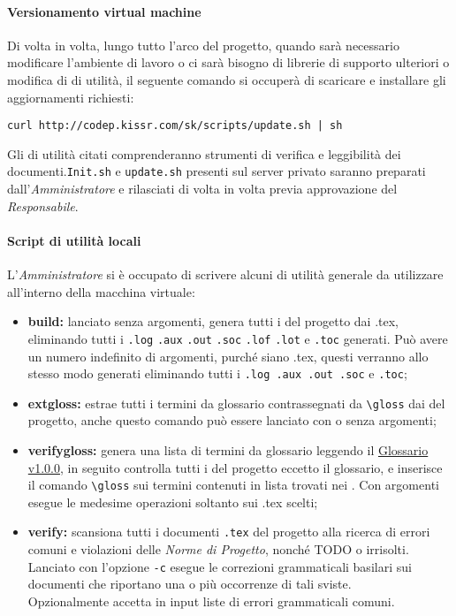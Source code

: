 \documentclass{scalatekids-article}
\begin{document}
\paragraph{Versionamento virtual machine}

Di volta in volta, lungo tutto l'arco del progetto, quando sarà necessario
modificare l'ambiente di lavoro o ci sarà bisogno di librerie di supporto
ulteriori o modifica di  di utilità, il seguente comando si
occuperà di scaricare e installare gli aggiornamenti richiesti:
\begin{center}
    \verb=curl http://codep.kissr.com/sk/scripts/update.sh | sh=
\end{center}
Gli  di utilità citati comprenderanno strumenti di verifica e
leggibilità dei documenti.\verb=Init.sh= e \verb=update.sh=
presenti sul server privato saranno preparati dall'\textit{Amministratore} e
rilasciati di volta in volta previa approvazione del \textit{Responsabile}.

\paragraph{Script di utilità locali}

\label{sec:script}
L'\textit{Amministratore} si è occupato di scrivere alcuni  di utilità
generale da utilizzare all'interno della macchina virtuale:
\begin{itemize}
    \item\textbf{build:} lanciato senza argomenti, genera tutti i  del
        progetto dai .tex, eliminando tutti i  \verb=.log= \verb=.aux= \verb=.out= \verb=.soc=
        \verb=.lof= \verb=.lot= e \verb=.toc=
        generati. Può avere un numero indefinito di argomenti, purché siano  .tex,
        questi verranno allo stesso modo generati eliminando tutti i 
        \verb=.log .aux .out .soc= e \verb=.toc=;
    \item\textbf{extgloss:} estrae tutti i termini da glossario contrassegnati da
        \verb=\gloss= dai  del progetto, anche questo comando può essere lanciato con
        o senza argomenti;
    \item\textbf{verifygloss:} genera una lista di termini da glossario leggendo il
         \href{run:../RR/Esterni/Glossario\_v0.0.1.pdf}{Glossario v1.0.0}, in seguito controlla tutti i  del
        progetto eccetto il glossario, e inserisce il comando \verb=\gloss= sui termini
        contenuti in lista trovati nei . Con argomenti esegue le medesime
        operazioni soltanto sui  .tex scelti;
    \item\textbf{verify:} scansiona tutti i documenti \verb=.tex= del progetto alla
        ricerca di errori comuni e violazioni delle \textit{Norme di Progetto}, nonché
        TODO o  irrisolti. Lanciato con l'opzione \verb=-c=
        esegue le correzioni grammaticali basilari sui documenti che riportano una o
        più occorrenze di tali sviste.\\
        Opzionalmente accetta in input liste di errori grammaticali comuni.
\end{itemize}
\end{document}
